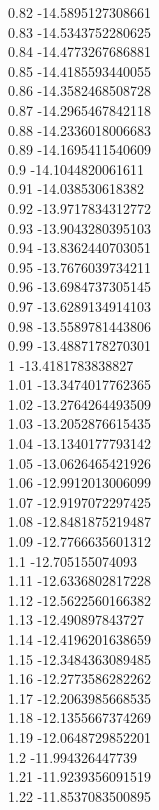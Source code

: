 {0.82	-14.5895127308661\\
0.83	-14.5343752280625\\
0.84	-14.4773267686881\\
0.85	-14.4185593440055\\
0.86	-14.3582468508728\\
0.87	-14.2965467842118\\
0.88	-14.2336018006683\\
0.89	-14.1695411540609\\
0.9	-14.1044820061611\\
0.91	-14.038530618382\\
0.92	-13.9717834312772\\
0.93	-13.9043280395103\\
0.94	-13.8362440703051\\
0.95	-13.7676039734211\\
0.96	-13.6984737305145\\
0.97	-13.6289134914103\\
0.98	-13.5589781443806\\
0.99	-13.4887178270301\\
1	-13.4181783838827\\
1.01	-13.3474017762365\\
1.02	-13.2764264493509\\
1.03	-13.2052876615435\\
1.04	-13.1340177793142\\
1.05	-13.0626465421926\\
1.06	-12.9912013006099\\
1.07	-12.9197072297425\\
1.08	-12.8481875219487\\
1.09	-12.7766635601312\\
1.1	-12.705155074093\\
1.11	-12.6336802817228\\
1.12	-12.5622560166382\\
1.13	-12.490897843727\\
1.14	-12.4196201638659\\
1.15	-12.3484363089485\\
1.16	-12.2773586282262\\
1.17	-12.2063985668535\\
1.18	-12.1355667374269\\
1.19	-12.0648729852201\\
1.2	-11.994326447739\\
1.21	-11.9239356091519\\
1.22	-11.8537083500895\\
}
